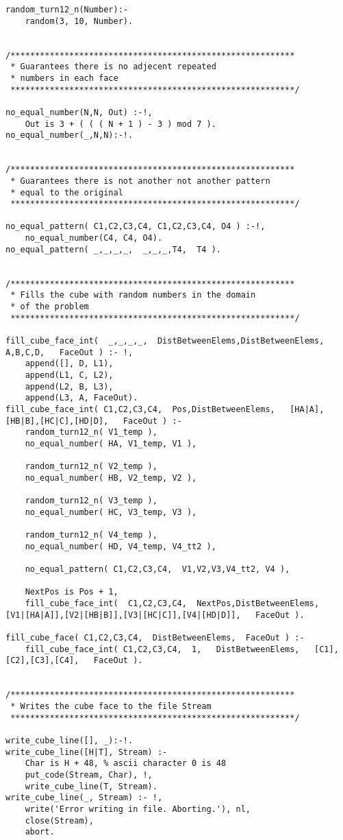 \begin{lstlisting}
random_turn12_n(Number):-
	random(3, 10, Number).
	
	
/**********************************************************
 * Guarantees there is no adjecent repeated
 * numbers in each face
 **********************************************************/
 
no_equal_number(N,N, Out) :-!,
	Out is 3 + ( ( ( N + 1 ) - 3 ) mod 7 ).
no_equal_number(_,N,N):-!.	


/**********************************************************
 * Guarantees there is not another not another pattern
 * equal to the original
 **********************************************************/
 
no_equal_pattern( C1,C2,C3,C4, C1,C2,C3,C4, O4 ) :-!,
	no_equal_number(C4, C4, O4).
no_equal_pattern( _,_,_,_,  _,_,_,T4,  T4 ).


/**********************************************************
 * Fills the cube with random numbers in the domain
 * of the problem
 **********************************************************/

fill_cube_face_int(  _,_,_,_,  DistBetweenElems,DistBetweenElems,   A,B,C,D,   FaceOut ) :- !,
	append([], D, L1),
	append(L1, C, L2),
	append(L2, B, L3),
	append(L3, A, FaceOut).
fill_cube_face_int( C1,C2,C3,C4,  Pos,DistBetweenElems,   [HA|A],[HB|B],[HC|C],[HD|D],   FaceOut ) :-
	random_turn12_n( V1_temp ),
	no_equal_number( HA, V1_temp, V1 ),
		
	random_turn12_n( V2_temp ),
	no_equal_number( HB, V2_temp, V2 ),
	
	random_turn12_n( V3_temp ),
	no_equal_number( HC, V3_temp, V3 ),
	
	random_turn12_n( V4_temp ),
	no_equal_number( HD, V4_temp, V4_tt2 ),

	no_equal_pattern( C1,C2,C3,C4,  V1,V2,V3,V4_tt2, V4 ),
	
	NextPos is Pos + 1,
	fill_cube_face_int(  C1,C2,C3,C4,  NextPos,DistBetweenElems,   [V1|[HA|A]],[V2|[HB|B]],[V3|[HC|C]],[V4|[HD|D]],   FaceOut ).
	
fill_cube_face( C1,C2,C3,C4,  DistBetweenElems,  FaceOut ) :-
	fill_cube_face_int( C1,C2,C3,C4,  1,   DistBetweenElems,   [C1],[C2],[C3],[C4],   FaceOut ).	


/**********************************************************
 * Writes the cube face to the file Stream
 **********************************************************/
 
write_cube_line([], _):-!.
write_cube_line([H|T], Stream) :-
	Char is H + 48, % ascii character 0 is 48
	put_code(Stream, Char), !,
	write_cube_line(T, Stream).
write_cube_line(_, Stream) :- !,
	write('Error writing in file. Aborting.'), nl,
	close(Stream),
	abort.
	

\end{lstlisting}

